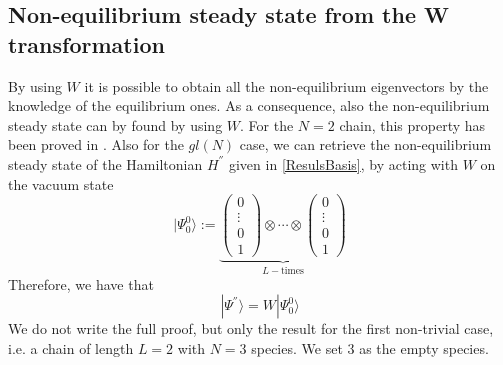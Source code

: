 \documentclass[10pt]{article}
\numberwithin{equation}{section}
\numberwithin{equation}{subsection}
\begin{document}
\subsection{Non-equilibrium steady state from the W transformation}
By using $W$ it is possible to obtain all the non-equilibrium eigenvectors by the knowledge of the equilibrium ones. As a consequence, also the non-equilibrium steady state can by found by using $W$. For the $N=2$ chain, this property has been proved in \cite{frassek2020eigenstates}. Also for the $gl(N)$ case, we can retrieve the non-equilibrium steady state of the Hamiltonian $H^{''}$ given in \eqref{ResulsBasis}, by acting with $W$ on the vacuum state 
\begin{equation}
	|\Psi_{0}^{0}\rangle:=\underbrace{\begin{pmatrix}
		0\\
		\vdots\\
		0\\
		1
	\end{pmatrix}\otimes \cdots \otimes\begin{pmatrix}
		0\\
		\vdots\\
		0\\
		1
	\end{pmatrix}}_{L-\text{times}}
\end{equation}
Therefore, we have that 
\begin{equation}
	|\Psi^{''}\rangle=W|\Psi_{0}^{0}\rangle
\end{equation}
We do not write the full proof, but only the result for the first non-trivial case, i.e. a chain of length $L=2$ with $N=3$ species. We set $3$ as the empty species.  
\end{document}

